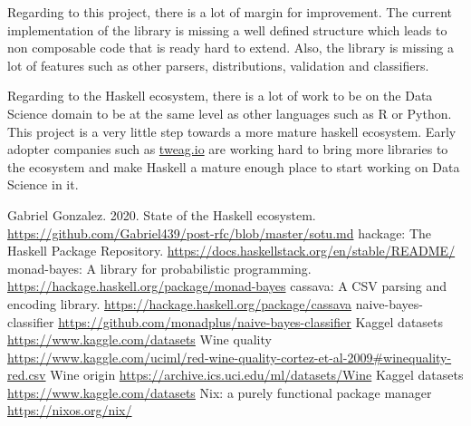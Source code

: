 \documentclass[12pt, a4paper]{article}
\begin{document}
Regarding to this project, there is a lot of margin for improvement. The current implementation of the library is missing a well defined structure which leads
to non composable code that is ready hard to extend. Also, the library is missing a lot of features such as other parsers, distributions, validation and classifiers.

Regarding to the Haskell ecosystem, there is a lot of work to be on the Data Science domain to be at the same level as other languages such as R or Python. This project is
a very little step towards a more mature haskell ecosystem. Early adopter companies such as \href{https://www.tweag.io/}{tweag.io} are working hard to bring more libraries to the ecosystem and make Haskell a mature enough place to start working on Data Science in it.

\begin{thebibliography}{9}
 Gabriel Gonzalez. 2020. State of the Haskell ecosystem. \url{https://github.com/Gabriel439/post-rfc/blob/master/sotu.md}
 hackage: The Haskell Package Repository. \url{https://docs.haskellstack.org/en/stable/README/}
 monad-bayes: A library for probabilistic programming. \url{https://hackage.haskell.org/package/monad-bayes}
 cassava: A CSV parsing and encoding library. \url{https://hackage.haskell.org/package/cassava}
 naive-bayes-classifier \url{https://github.com/monadplus/naive-bayes-classifier}
 Kaggel datasets \url{https://www.kaggle.com/datasets}
 Wine quality \url{https://www.kaggle.com/uciml/red-wine-quality-cortez-et-al-2009#winequality-red.csv}
 Wine origin \url{https://archive.ics.uci.edu/ml/datasets/Wine}
 Kaggel datasets \url{https://www.kaggle.com/datasets}
 Nix: a purely functional package manager \url{https://nixos.org/nix/}
\end{thebibliography}
\end{document}
